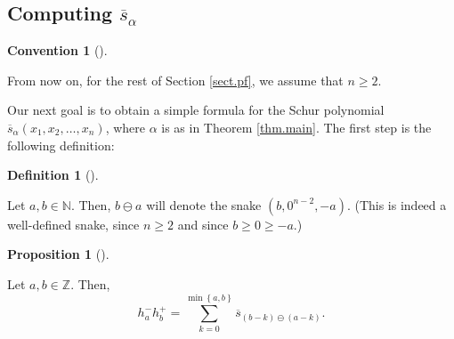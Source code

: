 \documentclass[numbers=enddot,12pt,final,onecolumn,notitlepage]{scrartcl}%
\theoremstyle{definition}
\newtheorem{prop}[theo]{Proposition}
\newenvironment{proposition}[1][]
{\begin{prop}[#1]\begin{leftbar}}
{\end{leftbar}\end{prop}}
\newtheorem{defi}[theo]{Definition}
\newenvironment{definition}[1][]
{\begin{defi}[#1]\begin{leftbar}}
{\end{leftbar}\end{defi}}
\newtheorem{conv}[theo]{Convention}
\newenvironment{convention}[1][]
{\begin{conv}[#1]\begin{leftbar}}
{\end{leftbar}\end{conv}}
\let\sumnonlimits\sum
\renewcommand{\sum}{\sumnonlimits\limits}
\begin{document}
\subsection{Computing $\overline{s}_{\alpha}$}

\begin{convention}
From now on, for the rest of Section \ref{sect.pf}, we assume that $n\geq2$.
\end{convention}

Our next goal is to obtain a simple formula for the Schur polynomial
$\overline{s}_{\alpha}\left(  x_{1},x_{2},\ldots,x_{n}\right)  $, where
$\alpha$ is as in Theorem \ref{thm.main}. The first step is the following definition:

\begin{definition}
\label{def.ominus}Let $a,b\in\mathbb{N}$. Then, $b\ominus a$ will denote the
snake $\left(  b,0^{n-2},-a\right)  $. (This is indeed a well-defined snake,
since $n\geq2$ and since $b\geq0\geq-a$.)
\end{definition}

\begin{proposition}
\label{prop.ominus.h}Let $a,b\in\mathbb{Z}$. Then,%
\begin{equation}
h_{a}^{-}h_{b}^{+}=\sum_{k=0}^{\min\left\{  a,b\right\}  }\overline
{s}_{\left(  b-k\right)  \ominus\left(  a-k\right)  }.
\label{eq.prop.ominus.h.eq}%
\end{equation}

\end{proposition}
\end{document}

